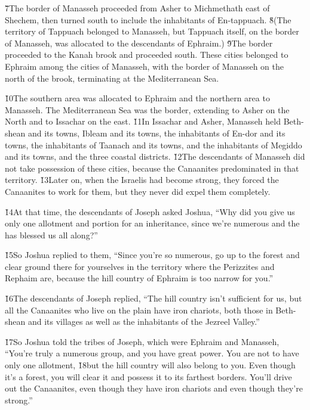 \v{7}The border of Manasseh proceeded from Asher to Michmethath east of Shechem, then turned south to include the inhabitants of En-tappuach. \v{8}(The territory of Tappuach belonged to Manasseh, but Tappuach itself, on the border of Manasseh, was allocated to the descendants of Ephraim.) \v{9}The border proceeded to the Kanah brook and proceeded south. These cities belonged to Ephraim among the cities of Manasseh, with the border of Manasseh on the north of the brook, terminating at the Mediterranean Sea.

\v{10}The southern area was allocated to Ephraim and the northern area to Manasseh. The Mediterranean Sea was the border, extending to Asher on the North and to Issachar on the east. \v{11}In Issachar and Asher, Manasseh held Beth-shean and its towns, Ibleam and its towns, the inhabitants of En-dor and its towns, the inhabitants of Taanach and its towns, and the inhabitants of Megiddo and its towns, and the three coastal districts. \v{12}The descendants of Manasseh did not take possession of these cities, because the Canaanites predominated in that territory. \v{13}Later on, when the Israelis had become strong, they forced the Canaanites to work for them, but they never did expel them completely.

\v{14}At that time, the descendants of Joseph asked Joshua, ``Why did you give us only one allotment and portion for an inheritance, since we're numerous and the  has blessed us all along?''

\v{15}So Joshua replied to them, ``Since you're so numerous, go up to the forest and clear ground there for yourselves in the territory where the Perizzites and Rephaim are, because the hill country of Ephraim is too narrow for you.''

\v{16}The descendants of Joseph replied, ``The hill country isn't sufficient for us, but all the Canaanites who live on the plain have iron chariots, both those in Beth-shean and its villages as well as the inhabitants of the Jezreel Valley.''

\v{17}So Joshua told the tribes of Joseph, which were Ephraim and Manasseh, ``You're truly a numerous group, and you have great power. You are not to have only one allotment, \v{18}but the hill country will also belong to you. Even though it's a forest, you will clear it and possess it to its farthest borders. You'll drive out the Canaanites, even though they have iron chariots and even though they're strong.''

